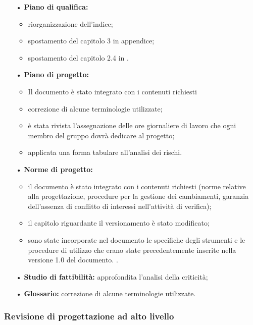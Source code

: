 {{{\begin{itemize}
			\item[•] \textbf{Piano di qualifica:}
				\begin{itemize}
					\item riorganizzazione dell'indice;
					\item spostamento del capitolo 3 in appendice;
					\item spostamento del capitolo 2.4 in
					\emph{\NormeDiProgetto}.
				\end{itemize}
			
			\item[•] \textbf{Piano di progetto:}
				\begin{itemize}
					\item Il documento è stato integrato con i contenuti
				richiesti
					\item correzione di alcune terminologie utilizzate;
					\item è stata rivista l’assegnazione delle ore giornaliere di
				lavoro che ogni membro del gruppo dovrà dedicare al progetto;
					\item applicata una forma tabulare all'analisi dei rischi.
				\end{itemize}
			
			\item[•] \textbf{Norme di progetto:}
				\begin{itemize}
					\item il documento è stato integrato con i contenuti
					richiesti (norme relative alla progettazione, procedure per la gestione dei cambiamenti, garanzia dell'assenza di conflitto di interessi nell'attività di verifica);
					\item il capitolo riguardante il versionamento è stato
					modificato;
					\item sono state incorporate nel documento le specifiche degli
					strumenti e le procedure di utilizzo che erano state
					precedentemente inserite nella versione 1.0 del documento.
					\emph{\PianoDiQualifica}.		
				\end{itemize}
			
			\item[•] \textbf{Studio di fattibilità:} approfondita l'analisi della criticità;
			\item[•] \textbf{Glossario:} correzione di alcune terminologie utilizzate.
			
		\end{itemize}
	}
	
	\subsubsection{Revisione di progettazione ad alto livello}{

}}}
